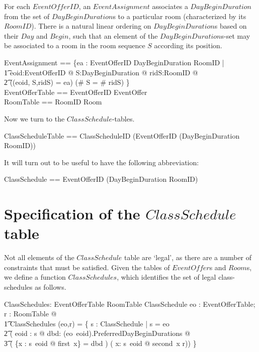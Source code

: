\documentclass[a4paper]{article}
\begin{document}
\noindent
For each $EventOfferID$, an $EventAssignment$ associates a $DayBeginDuration$
from the set of $DayBeginDuration$s to a particular room (characterized by its
$RoomID$). There is a natural linear ordering on $DayBeginDuration$s based on
their $Day$ and $Begin$, such that an element of the $DayBeginDuration$s-set may
be associated to a room in the room sequence $S$ according its position.
\begin{zed} 
  EventAssignment == \{ea : EventOfferID \cross \power DayBeginDuration \cross
  \seq RoomID | \\ 
  \t1 \exists eoid:EventOfferID @ \exists S:\power DayBeginDuration @ \exists
  ridS:\seq RoomID @ \\ 
  \t2 ((eoid, S,ridS) = ea) \land (\# S = \# ridS) \} \\

  EventOfferTable == EventOfferID \pinj EventOffer \\

  RoomTable == RoomID \pinj Room \\
\end{zed}
  
\noindent
Now we turn to the $ClassSchedule$-tables.
\begin{zed}
  ClassScheduleTable == ClassScheduleID \pinj (EventOfferID \pinj \power
  (DayBeginDuration \cross RoomID)) \\
\end{zed}

\noindent
It will turn out to be useful to have the following abbreviation:
\begin{zed} 
  ClassSchedule == EventOfferID \pinj \power (DayBeginDuration \cross RoomID) \\
\end{zed} 


\section{Specification of the $ClassSchedule$ table} 


\vspace{1ex}\noindent
Not all elements of the $ClassSchedule$ table are `legal', as there are a number
of constraints that must be satisfied.  Given the tables of $EventOffer$s and
$Room$s, we define a function $ClassSchedules$, which identifies the set of
legal class-schedules as follows.
\begin{axdef}
  ClassSchedules: EventOfferTable \cross RoomTable \fun \power ClassSchedule
  \where
  \forall eo : EventOfferTable; r : RoomTable @ \\
  \t1 ClassSchedules (eo,r) = \{ s : ClassSchedule | \dom s = \dom eo \land \\
  \t2 ( \forall eoid : \dom s @ \exists dbd:
  (eo~eoid).PreferredDayBeginDurations @ \\ 
  \t3 ( \{x : s~eoid @ first~x\} = dbd ) \land ( \forall x: s~eoid @  second~x
  \in \dom r)) \} \\
\end{axdef}
\end{document}
